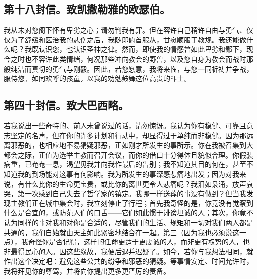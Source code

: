 \subsection{第十八封信。致凯撒勒雅的欧瑟伯。}

我从未对您阁下怀有卑劣之心；请勿判我有罪。但在容许自己稍许自由与勇气、仅仅为了舒缓和医治我的悲伤之后，我随即俯首服从，甘愿顺服于教规。我还能做什么呢？我既认识您，也认识圣神之律。然而，即使我的情感曾如此卑劣和鄙下，现今之时也不容许此类情绪，何况那些冲向教会的野兽，以及您自身为教会而战时那般纯洁而真切的勇气与刚毅。因此，若您愿意，我将来临，与您一同祈祷并争战，服侍您，如同欢呼的孩童，以我的劝勉鼓舞这位高贵的斗士。\par


\subsection{第四十封信。致大巴西略。}

\par

若我说出一些奇特的、前人未曾说过的话，请勿惊讶。我认为你有稳健、可靠且意志坚定的名声，但在你的许多计划和行动中，却显得过于单纯而非稳健。因为那远离邪恶的，也相应地不易猜疑邪恶，正如刚才所发生的事所示。你在我被召集到大都会之际，正值为选举主教而召开会议，而你的借口十分得体且貌似合理。你假装病重，已奄奄一息，渴望见我并向我作最后的告别；我不知道其目的何在，甚至不知道我的到场能对这事有何影响。我为所发生的事深感悲痛地出发；因为对我来说，有什么比你的生命更宝贵，或比你的离世更令人悲痛呢？我泪如泉涌，放声哀哭，第一次感到自己失去了哲学家的镇定。我哪一样送葬的事没有做到？但当我发现主教们正在城中集会时，我立刻停止了行程；首先我奇怪的是，你竟没有觉察到什么是合宜的，或防范人们的口舌——它们如此惯于诽谤坦诚的人；其次，你竟不认为同样的事对我和对你是合适的，尽管我们的生活、规矩和一切对我们两人都是共通的，我们自始就由天主如此紧密地结合在一起。第三（因为我也必须说这一点），我奇怪你是否记得，这样的任命更适于更虔诚的人，而非更有权势的人，也非最得民心的人。因这些缘故，我便后退并迟疑了。如今，若你与我想法相同，就作出这个决定吧：避免这些公共的纷争和邪恶的猜疑。等事情安定、时间允许时，我将拜见你的尊驾，并将向你提出更多更严厉的责备。\par

